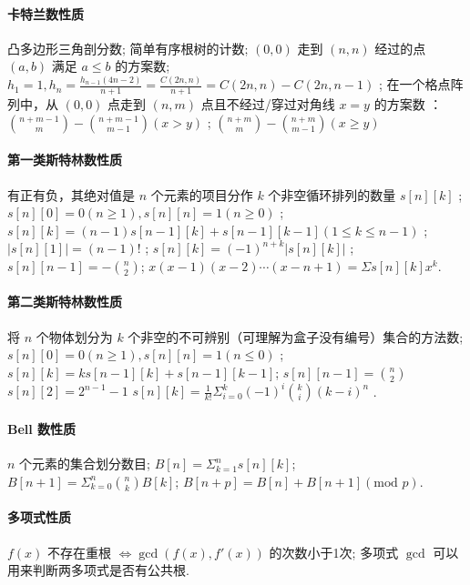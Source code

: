 \documentclass[landscape,a4paper]{article}
\begin{document}
\paragraph{卡特兰数性质} 
 凸多边形三角剖分数;
 简单有序根树的计数;
 $(0, 0)$ 走到 $(n, n)$ 经过的点 $(a, b)$ 满足 $a \leq b$ 的方案数;
 $h_1 = 1, h_n = \frac{h_{n-1}(4n-2)}{n+1} = \frac{C(2n, n)}{n+1} = C(2n, n) - C(2n, n-1)$ ;
 在一个格点阵列中，从 $(0, 0)$ 点走到 $(n, m)$ 点且不经过/穿过对角线 $x = y$ 的方案数 ： $\binom{n+m-1}{m} - \binom{n+m-1}{m-1} (x > y)$ ;  $\binom{n+m}{m} - \binom{n+m}{m-1} (x \geq y)$ 

\paragraph{第一类斯特林数性质}
 有正有负，其绝对值是 $n$ 个元素的项目分作 $k$ 个非空循环排列的数量 $s[n][k]$ ;
 $s[n][0] = 0 (n \geq 1), s[n][n] = 1 (n \geq 0)$ ;
 $s[n][k] = (n-1)s[n-1][k] + s[n - 1][k - 1] (1 \leq k \leq n - 1)$ ;
 $|s[n][1]| = (n-1)!$ ;
 $s[n][k] = (-1)^{n+k}|s[n][k]|$ ;
 $s[n][n-1] = -\binom{n}{2}$;
 $x(x-1)(x-2) \cdots (x-n+1) = \Sigma{s[n][k]x^k}$.

\paragraph{第二类斯特林数性质}
 将 $n$ 个物体划分为 $k$ 个非空的不可辨别（可理解为盒子没有编号）集合的方法数;
 $s[n][0] = 0 (n \geq 1), s[n][n] = 1 (n \leq 0)$ ;
 $s[n][k] = ks[n-1][k] + s[n-1][k-1]$;
 $s[n][n - 1] = \binom{n}{2}$
 $s[n][2] = 2^{n-1}-1$
 $s[n][k] = \frac{1}{k!}\Sigma_{i=0}^{k} (-1)^i\binom{k}{i} (k-i)^n$ .

\paragraph{Bell 数性质}
 $n$ 个元素的集合划分数目;
 $B[n] = \Sigma_{k=1}^{n} s[n][k]$;
 $B[n+1] = \Sigma_{k=0}^{n} \binom{n}{k}B[k]$;
 $B[n+p]=B[n]+B[n+1] (\text{mod }p)$.

\paragraph{多项式性质}
 $f(x)$ 不存在重根 $\Leftrightarrow \gcd{(f(x), f'(x))}$ 的次数小于1次;
 多项式 $\gcd$ 可以用来判断两多项式是否有公共根.
\end{document}
